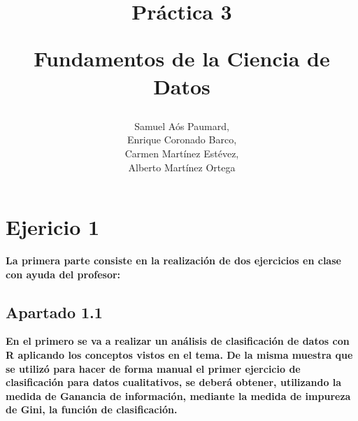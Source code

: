 \documentclass[a4paper]{article}
\title{ Práctica 3 \\
\begin{large}
     Fundamentos de la Ciencia de Datos
\end{large}
}
\author{Samuel Aós Paumard,\\
Enrique Coronado Barco,\\
Carmen Martínez Estévez,\\
Alberto Martínez Ortega}
\begin{document}

\maketitle

\section{Ejericio 1}
\textbf{La primera parte consiste en la realización de dos ejercicios en clase con ayuda del profesor:}
\subsection{Apartado 1.1}
\textbf{En el primero se va a realizar un análisis de clasificación de datos con R aplicando los conceptos vistos en el tema. De la misma muestra que se utilizó para hacer de forma manual el primer ejercicio de clasificación para datos cualitativos, se deberá obtener, utilizando la medida de Ganancia de información, mediante la medida de impureza de Gini, la función de clasificación.}
\end{document}
